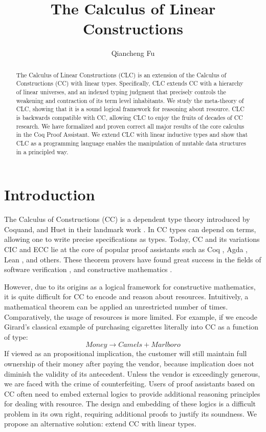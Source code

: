 \documentclass{article}
\title{The Calculus of Linear Constructions}
\author{Qiancheng Fu}
\theoremstyle{definition}
\begin{document}
  \maketitle 
  \begin{abstract}
    The Calculus of Linear Constructions (CLC) is an extension of the Calculus of Constructions (CC) with linear types. Specifically, CLC extends CC with a hierarchy of linear universes, and an indexed typing judgment that precisely controls the weakening and contraction of its term level inhabitants. We study the meta-theory of CLC, showing that it is a sound logical framework for reasoning about resource. CLC is backwards compatible with CC, allowing CLC to enjoy the fruits of decades of CC research. We have formalized and proven correct all major results of the core calculus in the Coq Proof Assistant. We extend CLC with linear inductive types and show that CLC as a programming language enables the manipulation of mutable data structures in a principled way.
  \end{abstract}

  \section{Introduction}
  The Calculus of Constructions (CC) is a dependent type theory introduced by Coquand, and Huet in their landmark work \cite{cc}. In CC types can depend on terms, allowing one to write precise specifications as types. Today, CC and its variations CIC \cite{cic} and ECC \cite{ecc} lie at the core of popular proof assistants such as Coq \cite{coq}, Agda \cite{agda}, Lean \cite{lean}, and others. These theorem provers have found great success in the fields of software verification \cite{compcert,deepspec}, and constructive mathematics \cite{four-color,schemes}. 
  
  However, due to its origins as a logical framework for constructive mathematics, it is quite difficult for CC to encode and reason about resources. Intuitively, a mathematical theorem can be applied an unrestricted number of times. Comparatively, the usage of resources is more limited. For example, if we encode Girard's classical example \cite{girard95} of purchasing cigarettes literally into CC as a function of type:
  \begin{equation*}
    Money \rightarrow Camels + Marlboro
  \end{equation*}
  If viewed as an propositional implication, the customer will still maintain full ownership of their money after paying the vendor, because implication does not diminish the validity of its antecedent. Unless the vendor is exceedingly generous, we are faced with the crime of counterfeiting. Users of proof assistants based on CC often need to embed external logics \cite{bedrock} to provide additional reasoning principles for dealing with resource. The design and embedding of these logics is a difficult problem in its own right, requiring additional proofs to justify its soundness. We propose an alternative solution: extend CC with linear types.
\end{document}
